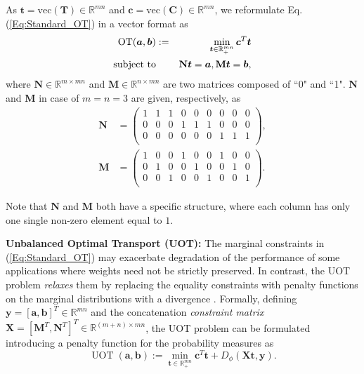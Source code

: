 \documentclass[twoside]{article}
\theoremstyle{plain}
\newcommand{\R}{\mathbb{R}}
\newcommand{\mat}[1]{\mathbf{#1}}
\renewcommand{\vec}[1]{\bm{#1}}
\begin{document}
As $\vec{t} = \text{vec}({\mat{T}}) \in \mathbb{R}^{mn}$ and $\vec{c} = \text{vec}({\mat{C}}) \in \mathbb{R}^{mn}$, we reformulate Eq.(\ref{Eq:Standard_OT}) in a vector format as \citep{Chapel_NeurIPS_2021}
\begin{eqnarray}
\label{Eq:Vector_OT}
\operatorname{OT}(\vec{a},\vec{b}) &:=& \min_{\vec{t} \in \R_{+}^{mn}} \vec{c}^T\vec{t} \\
\text{subject\ to}&& \mat{N}\vec{t} = \vec{a}, \mat{M}\vec{t} = \vec{b}, \notag
\end{eqnarray}
where $\mat{N} \in \R^{m \times mn}$ and $\mat{M} \in \R^{n \times mn}$ are two matrices composed of ``0" and ``1". $\mat{N}$ and $\mat{M}$ in case of $m=n=3$ are given, respectively, as
\begin{equation*}
\begin{split}
\mat{N}&=\begin{pmatrix}
1&1&1& 0& 0& 0& 0& 0&0\\
0 & 0& 0&1&1&1& 0& 0&0\\
0 & 0& 0& 0& 0& 0&1&1&1\\
\end{pmatrix},\\
\mat{M}&=\begin{pmatrix}
 1& 0& 0&1& 0& 0&1& 0&0\\
 0&1& 0& 0&1& 0& 0&1&0\\
 0& 0&1& 0& 0&1& 0& 0&1\\
 \end{pmatrix}.
  \end{split}
 \end{equation*}

Note that $\mat{N}$ and $\mat{M}$ both have a specific structure, where each column has only one single non-zero element equal to $1$. 

 
{\bf Unbalanced Optimal Transport (UOT):} The marginal constraints in (\ref{Eq:Standard_OT}) may exacerbate degradation of the performance of some applications where weights need not be strictly preserved. In contrast, the UOT problem {\it relaxes} them by replacing the equality constraints with penalty functions on the marginal distributions with a divergence \citep{Caffarelli_AM_2010,chizat2017scaling}. Formally, defining $\vec{y} = [\vec{a}, \vec{b}]^T \in \mathbb{R}^{mn}$ and the concatenation {\it constraint matrix} $\mat{X} = [\mat{M}^T,\mat{N}^T]^T \in \mathbb{R}^{(m+n) \times mn}$, the UOT problem can be formulated introducing a penalty function for the probability measures as \citep{Chapel_NeurIPS_2021}
\begin{equation}
\label{eq:uot}
\operatorname{UOT}(\vec{a},\vec{b}) := \min_{\vec{t} \in \R_{+}^{mn}} \vec{c}^T\vec{t} + D_\phi(\mat{X}\vec{t},\vec{y}).
\end{equation}
\end{document}
